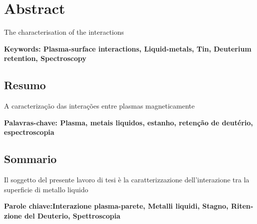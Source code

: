 \chapter*{Abstract}
The characterisation of the interactions 

\vfill

\textbf{Keywords: Plasma-surface interactions, Liquid-metals, Tin, Deuterium retention, Spectroscopy} 

\pagebreak
\begin{otherlanguage}{portuguese}
\chapter*{Resumo}
A caracteriza\c{c}\~{a}o das intera\c{c}\~{o}es entre plasmas magneticamente

\vfill

\textbf{ Palavras-chave: Plasma, metais liquidos, estanho, reten\c{c}\~{a}o de deut\'{e}rio, espectroscopia} 
\end{otherlanguage}
\pagebreak
\begin{otherlanguage}{italian}
\chapter*{Sommario}

Il soggetto del presente lavoro di tesi \`{e} la caratterizzazione dell'interazione tra la superficie di metallo liquido


\vfill

\textbf{Parole chiave:Interazione plasma-parete, Metalli liquidi, Stagno, Ritenzione del Deuterio, Spettroscopia} 
\end{otherlanguage}



